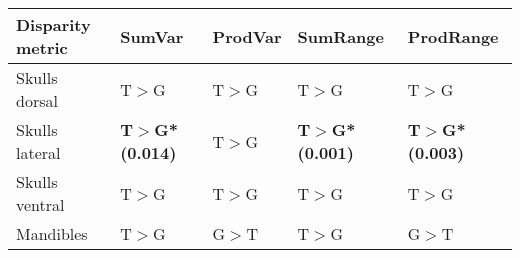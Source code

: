 

\begin{tabular}[t]{l l l l l }		
\hline
\textbf{Disparity metric} & \textbf{SumVar} & \textbf{ProdVar} & \textbf{SumRange} & \textbf{ProdRange} \\
\hline
Skulls dorsal & T$>$G & T$>$G & T$>$G & T$>$G\\
Skulls lateral	& \textbf{T$>$G* (0.014)} & T$>$G & \textbf{T$>$G* (0.001)} & \textbf{T$>$G*(0.003)}\\
Skulls ventral & T$>$G & T$>$G & T$>$G & T$>$G\\
Mandibles & T$>$G & G$>$T & T$>$G & G$>$T\\
\hline
\end{tabular}